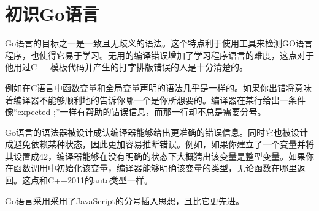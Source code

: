 \chapter{初识Go语言}
Go语言的目标之一是一致且无歧义的语法。这个特点利于使用工具来检测GO语言程序，也使得它易于学习。无用的编译错误增加了学习程序语言的难度，这点对于他用过C++模板代码并产生的打字排版错误的人是十分清楚的。

例如在C语言中函数变量和全局变量声明的语法几乎是一样的。如果你出错将意味着编译器不能够顺利地的告诉你哪一个是你所想要的。编译器在某行给出一条件像“expected ;”一样有帮助的错误信息，而那一行却不总是需要分号。

Go语言的语法器被设计成认编译器能够给出更准确的错误信息。同时它也被设计成避免依赖某种状态，因此更加容易推断错误。例如，如果你建立了一个变量并将其设置成42，编译器能够在没有明确的状态下大概猜出该变量是整型变量。如果你在函数调用中初始化该变量，编译器能够明确该变量的类型，无论函数在哪里返回。这点和C++2011的auto类型一样。

Go语言采用采用了JavaScript的分号插入思想，且比它更先进。
\endinput